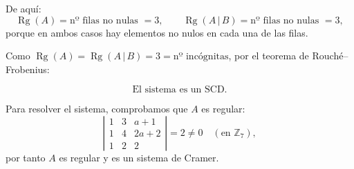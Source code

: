 \documentclass[a4paper,12pt]{article}
\begin{document}
\begin{ejercicio}[title=Ejercicio 30]
De aquí:
\[
\operatorname{Rg}(A)=\text{nº filas no nulas }=3,\qquad
\operatorname{Rg}(A\,|\,B)=\text{nº filas no nulas }=3,
\]
porque en ambos casos hay elementos no nulos en cada una de las filas.

\vspace{0.5em}

Como \(\operatorname{Rg}(A)=\operatorname{Rg}(A\,|\,B)=3=\text{nº incógnitas}\), por el teorema de Rouché–Frobenius:

\[\boxed{\text{El sistema es un SCD.}}\]

\vspace{0.5em}

Para resolver el sistema, comprobamos que \(A\) es regular:
\[
\left|
\begin{matrix}
1 & 3 & a+1\\
1 & 4 & 2a+2\\
1 & 2 & 2
\end{matrix}
\right| = 2 \neq 0 \quad(\text{en }\mathbb{Z}_7),
\]
por tanto \(A\) es regular y es un sistema de Cramer.  
\end{ejercicio}
\end{document}
